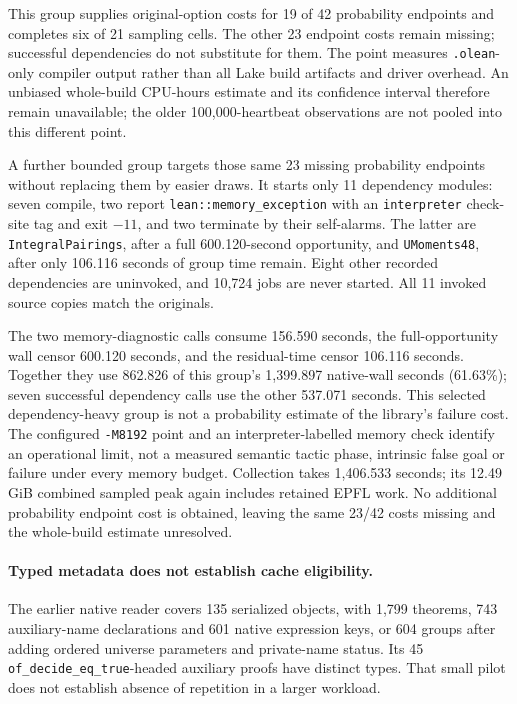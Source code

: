 \documentclass[10pt,twocolumn]{article}
\begin{document}
This group supplies original-option costs for 19 of 42 probability endpoints
and completes six of 21 sampling cells. The other 23 endpoint costs remain
missing; successful dependencies do not substitute for them. The point
measures \texttt{.olean}-only compiler output rather than all Lake build
artifacts and driver overhead. An unbiased whole-build CPU-hours estimate
and its confidence interval therefore remain unavailable; the older
100,000-heartbeat observations are not pooled into this different point.

A further bounded group targets those same 23 missing probability
endpoints without replacing them by easier draws. It starts only 11
dependency modules: seven compile, two report
\texttt{lean::memory\_exception} with an \texttt{interpreter} check-site tag
and exit $-11$, and two terminate by their self-alarms. The latter are
\texttt{IntegralPairings}, after a full 600.120-second opportunity, and
\texttt{UMoments48}, after only 106.116 seconds of group time remain.
Eight other recorded dependencies are uninvoked, and 10,724 jobs are never
started. All 11 invoked source copies match the originals.

The two memory-diagnostic calls consume 156.590 seconds, the full-opportunity
wall censor 600.120 seconds, and the residual-time censor 106.116 seconds.
Together they use 862.826 of this group's 1,399.897 native-wall seconds
(61.63\%); seven successful dependency calls use the other 537.071 seconds.
This selected dependency-heavy group is not a probability estimate of the
library's failure cost. The configured \texttt{-M8192} point and an
interpreter-labelled memory check identify an operational limit, not a
measured semantic tactic phase, intrinsic false goal or failure under every
memory budget. Collection takes 1,406.533 seconds; its 12.49\,GiB combined
sampled peak again includes retained EPFL work. No additional probability
endpoint cost is obtained, leaving the same 23/42 costs missing and the
whole-build estimate unresolved.

\paragraph{Typed metadata does not establish cache eligibility.}
The earlier native reader covers 135 serialized objects, with 1,799 theorems,
743 auxiliary-name declarations and 601 native expression keys, or 604
groups after adding ordered universe parameters and private-name status.
Its 45 \texttt{of\_decide\_eq\_true}-headed auxiliary proofs have distinct
types. That small pilot does not establish absence of repetition in a
larger workload.
\end{document}
